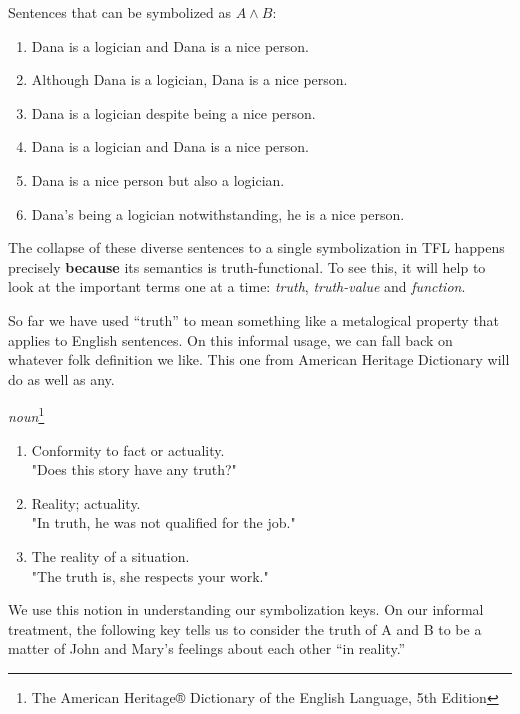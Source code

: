 \begin{example}
  Sentences that can be symbolized as $A \wedge B$:
  \begin{enumerate}
  \item Dana is a logician and Dana is a nice person.
  \item Although Dana is a logician, Dana is a nice person.
  \item Dana is a logician despite being a nice person.
  \item Dana is a logician and Dana is a nice person.
  \item Dana is a nice person but also a logician. 
  \item Dana's being a logician notwithstanding, he is a nice person.
  \end{enumerate}
\end{example}

The collapse of these diverse sentences to a single symbolization in TFL happens
precisely \textbf{because} its semantics is truth-functional. To see this, it
will help to look at the important terms one at a time: \emph{truth},
\emph{truth-value} and \emph{function}.

So far we have used ``truth'' to mean something like a metalogical property that
applies to English sentences. On this informal usage, we can fall back on
whatever folk definition we like. This one from American Heritage Dictionary
will do as well as any.

\begin{definition} \emph{noun}\footnote{
  The American Heritage® Dictionary of the English Language, 5th Edition}
  \begin{enumerate}
  \item Conformity to fact or actuality. \\ "Does this story have any truth?"
  \item Reality; actuality. \\ "In truth, he was not qualified for the job."
  \item The reality of a situation. \\ "The truth is, she respects your work."
  \end{enumerate}
\end{definition}

We use this notion in understanding our symbolization keys. On our informal
treatment, the following key tells us to consider the truth of A and B to be a
matter of John and Mary's feelings about each other ``in reality.''

